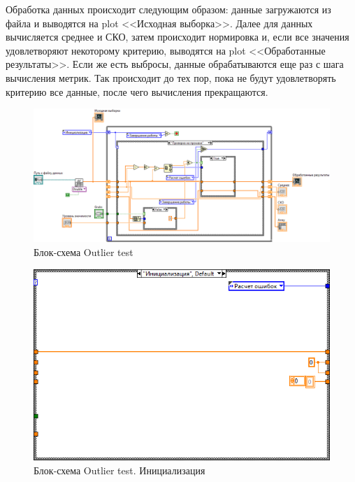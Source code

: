 \documentclass[a4paper,14pt]{article}
\begin{document}
Обработка данных происходит следующим образом: данные загружаются из файла и выводятся на plot <<Исходная выборка>>.
Далее для данных вычисляется среднее и СКО, затем происходит нормировка и, если все значения удовлетворяют некоторому критерию, выводятся на plot <<Обработанные результаты>>.
Если же есть выбросы, данные обрабатываются еще раз с шага вычисления метрик.
Так происходит до тех пор, пока не будут удовлетворять критерию все данные, после чего вычисления прекращаются.

\begin{figure}[H]
    \centering
    \includegraphics[width=\linewidth]{image/ot_schema}
    \caption{Блок-схема Outlier test}\label{img:ot_schema}
\end{figure}

\begin{figure}[H]
    \centering
    \includegraphics[width=0.5\linewidth]{image/ot_schema_init}
    \caption{Блок-схема Outlier test. Инициализация}\label{img:ot_schema_init}
\end{figure}
\end{document}
